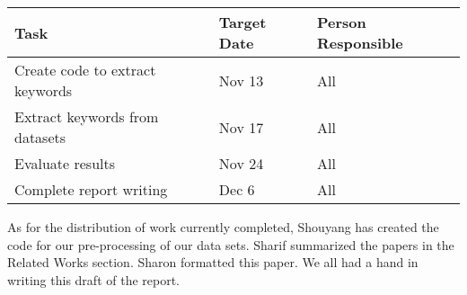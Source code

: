 \documentclass[11pt,a4paper]{article}
\begin{document}
\begin{table}[h]
\begin{center}
\begin{tabular}{|p{3.3cm}|p{1.4cm}|p{1.7cm}|}
\hline \bf Task & \bf Target Date & \bf Person  Responsible \\  
\hline
 Create code to extract keywords & Nov 13 & All \\ 
\hline 
 Extract keywords from datasets & Nov 17 & All \\
\hline
 Evaluate results & Nov 24 & All \\
\hline
Complete report writing & Dec 6 & All  \\
\hline   
\end{tabular}
\end{center}
\end{table}

As for the distribution of work currently completed, Shouyang has created the code for our pre-processing of our data sets. Sharif summarized the papers in the Related Works section. Sharon formatted this paper. We all had a hand in writing this draft of the report. 

%
%


\end{document}
